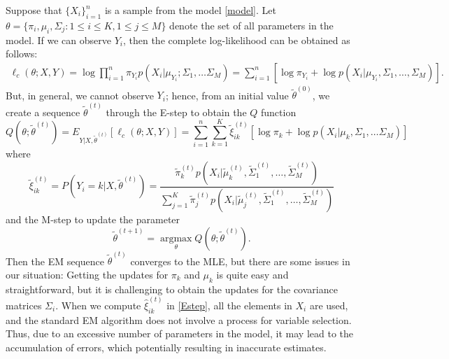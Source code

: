 \documentclass[11pt]{article}
\newcommand{\amax}{\operatorname*{argmax}}
\newcommand{\wh}{\widehat}
\newcommand{\wt}{\widetilde}
\begin{document}
Suppose that $\{X_i\}_{i=1}^n$ is a sample from the model \eqref{model}. Let $\theta=\{\pi_i, \mu_i, \Sigma_j: 1\le i \le K, 1\le j \le M\}$ denote the set of all parameters in the model.
If we can observe $Y_i$, then the complete log-likelihood can be obtained as follows:
\begin{align*}
  \ell_c (\theta;X,Y) = \log \prod_{i=1}^n \pi_{Y_i} p(X_i|\mu_{Y_i};\Sigma_1,\dots \Sigma_M)=  \sum_{i=1}^n [\log\pi_{Y_i}+ \log p(X_i| \mu_{Y_i}, \Sigma_1,\dots , \Sigma_M)].
\end{align*}
But, in general, we cannot observe $Y_i$; hence, from an initial value $\wt\theta^{(0)}$, we create a sequence $\wt\theta^{(t)}$ through the E-step to obtain the $Q$ function
\begin{equation*}
 Q(\theta; \wt\theta^{(t)}) = E_{Y|X,\wt\theta^{(t)}}[\ell_c(\theta;X,Y)] = \sum_{i=1}^n \sum_{k=1}^K \wt \xi_{ik}^{(t)} [ \log \pi_k + \log p(X_i | \mu_k , \Sigma_1,\dots \Sigma_M)]
\end{equation*}
where
\begin{equation}\label{Estep}
  \wt\xi _{ik}^{(t)} = P(Y_i=k| X,\wt\theta^{(t)}) = \frac{\wt\pi_k^{(t)} p(X_i|\wt \mu_k^{(t)}, \wt\Sigma_1^{(t)},  \dots, \wt \Sigma_M^{(t)})}{\sum_{j=1}^K \wt\pi_j^{(t)} p(X_i | \wt\mu_j^{(t)}, \wt\Sigma_1^{(t)}, \dots, \wt\Sigma_M^{(t)})}
\end{equation}
and the M-step to update the parameter
\begin{equation*}
	\wt\theta^{(t+1)} = \amax_\theta Q(\theta; \wt\theta^{(t)}).
\end{equation*}
Then the EM sequence $\wt\theta^{(t)}$ converges to the MLE, but there are some issues in our situation:
Getting the updates for $\pi_k$ and $\mu_k$ is quite easy and straightforward, but it is challenging to obtain the updates for the covariance matrices $\Sigma_i$.
When we compute $\wh\xi^{(t)}_{ik}$ in \eqref{Estep}, all the elements in $X_i$ are used, and the standard EM algorithm does not involve a process for variable selection.
Thus, due to an excessive number of parameters in the model, it may lead to the accumulation of errors, which potentially resulting in inaccurate estimates.
\end{document}
